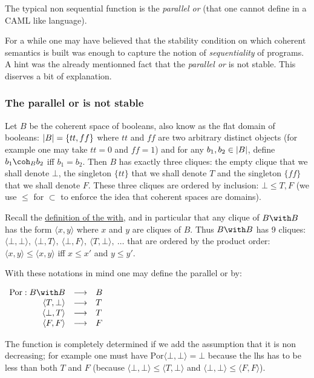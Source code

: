 The typical non sequential function is the \emph{parallel or} (that one
cannot define in a CAML like language).

For a while one may have believed that the stability condition on which
coherent semantics is built was enough to capture the notion of
\emph{sequentiality} of programs. A hint was the already mentionned fact
that the \emph{parallel or} is not stable. This diserves a bit of
explanation.

\subsubsection{The parallel or is not stable}\label{the-parallel-or-is-not-stable}

Let \(B\) be the coherent space of booleans, also know as the flat
domain of booleans: \(\left|B\right| = \{tt, ff\}\) where \(tt\) and \(ff\) are
two arbitrary distinct objects (for example one may take \(tt = 0\) and
\(ff = 1\)) and for any \(b_1, b_2\in \left|B\right|\), define \(b_1\coh_B b_2\)
iff \(b_1 = b_2\). Then \(B\) has exactly three cliques: the empty
clique that we shall denote \(\bot\), the singleton \(\{tt\}\) that we
shall denote \(T\) and the singleton \(\{ff\}\) that we shall denote
\(F\). These three cliques are ordered by inclusion: \(\bot \leq T, F\)
(we use \(\leq\) for \(\subset\) to enforce the idea that coherent
spaces are domains).

Recall the \protect\hyperlink{Cartesian_product}{definition of the
with}, and in particular that any clique of \(B\with B\) has the form
\(\langle x, y\rangle\) where \(x\) and \(y\) are cliques of \(B\). Thus
\(B\with B\) has 9 cliques:
\(\langle\bot,\bot\rangle,\ \langle\bot, T\rangle,\ \langle\bot, F\rangle,\ \langle T,\bot\rangle,\ \dots\)
that are ordered by the product order:
\(\langle x,y\rangle\leq \langle x,y\rangle\) iff \(x\leq x'\) and
\(y\leq y'\).

With these notations in mind one may define the parallel or by:

\(\begin{array}{rcl}
\mathrm{Por} : B\with B & \longrightarrow&  B\\
  \langle T,\bot\rangle & \longrightarrow&  T\\
  \langle \bot,T\rangle & \longrightarrow&  T\\
    \langle F, F\rangle & \longrightarrow&  F
\end{array}\)

The function is completely determined if we add the assumption that it
is non decreasing; for example one must have
\(\mathrm{Por}\langle\bot,\bot\rangle = \bot\) because the lhs has to be
less than both \(T\) and \(F\) (because
\(\langle\bot,\bot\rangle \leq \langle T,\bot\rangle\) and
\(\langle\bot,\bot\rangle \leq \langle F,F\rangle\)).

